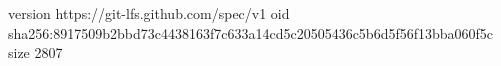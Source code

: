 version https://git-lfs.github.com/spec/v1
oid sha256:8917509b2bbd73c4438163f7c633a14cd5c20505436c5b6d5f56f13bba060f5c
size 2807
